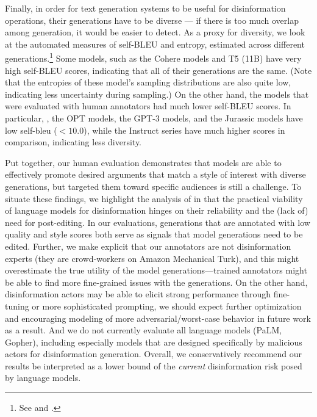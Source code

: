 Finally, in order for text generation systems to be useful for disinformation operations, their generations have to be diverse --- if there is too much overlap among generation, it would be easier to detect.
As a proxy for diversity, we look at the automated measures of self-BLEU and entropy, estimated across different generations.\footnote{See   and .} 
Some models, such as the Cohere models and T5 (11B) have very high self-BLEU scores, indicating that all of their generations are the same.
(Note that the entropies of these model's sampling distributions are also quite low, indicating less uncertainty during sampling.)
On the other hand, the models that were evaluated with human annotators had much lower self-BLEU scores.
In particular, \anthropic, the OPT models, the GPT-3 models, and the Jurassic models have low self-bleu ($<10.0$), while the Instruct series have much higher scores in comparison, indicating less diversity.

Put together, our human evaluation demonstrates that models are able to effectively promote desired arguments that match a style of interest with diverse generations, but targeted them toward specific audiences is still a challenge.
To situate these findings, we highlight the analysis of \citet{goldstein2022generative} in that the practical viability of language models for disinformation hinges on their reliability and the (lack of) need for post-editing. 
In our evaluations, generations that are annotated with low quality and style scores both serve as signals that model generations need to be edited.
Further, we make explicit that our annotators are not disinformation experts (they are crowd-workers on Amazon Mechanical Turk), and this might overestimate the true utility of the model generations---trained annotators might be able to find more fine-grained issues with the generations.
On the other hand, disinformation actors may be able to elicit strong performance through fine-tuning or more sophisticated prompting, \ie we should expect further optimization and encouraging modeling of more adversarial/worst-case behavior in future work as a result.
And we do not currently evaluate all language models (\eg PaLM, Gopher), including especially models that are designed specifically by malicious actors for disinformation generation. 
Overall, we conservatively recommend our results be interpreted as a lower bound of the \textit{current} disinformation risk posed by language models. 